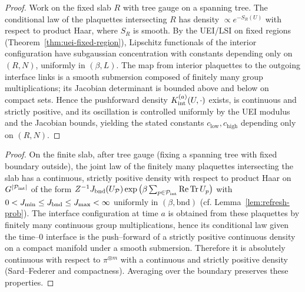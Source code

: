 \documentclass[11pt]{amsart}
\theoremstyle{plain}
\theoremstyle{definition}
\theoremstyle{remark}
\begin{document}
\begin{proof}
Work on the fixed slab $R$ with tree gauge on a spanning tree. The conditional law of the plaquettes intersecting $R$ has density $\propto e^{-S_R(U)}$ with respect to product Haar, where $S_R$ is smooth. By the UEI/LSI on fixed regions (Theorem~\ref{thm:uei-fixed-region}), Lipschitz functionals of the interior configuration have subgaussian concentration with constants depending only on $(R,N)$, uniformly in $(\beta,L)$. The map from interior plaquettes to the outgoing interface links is a smooth submersion composed of finitely many group multiplications; its Jacobian determinant is bounded above and below on compact sets. Hence the pushforward density $K_{\rm int}^{(a)}(U,\cdot)$ exists, is continuous and strictly positive, and its oscillation is controlled uniformly by the UEI modulus and the Jacobian bounds, yielding the stated constants $c_\mathrm{low},c_\mathrm{high}$ depending only on $(R,N)$.
\end{proof}

\begin{proof}
On the finite slab, after tree gauge (fixing a spanning tree with fixed boundary outside), the joint law of the finitely many plaquettes intersecting the slab has a continuous, strictly positive density with respect to product Haar on $G^{|\mathcal P_{\rm int}|}$ of the form $Z^{-1} J_{\rm bnd}(U_{\mathcal P})\exp\big(\beta \sum_{p\in\mathcal P_{\rm int}} \mathrm{Re\,Tr}\,U_p\big)$ with $0<J_{\min}\le J_{\rm bnd}\le J_{\max}<\infty$ uniformly in $(\beta,\text{bnd})$ (cf. Lemma~\ref{lem:refresh-prob}). The interface configuration at time $a$ is obtained from these plaquettes by finitely many continuous group multiplications, hence its conditional law given the time–$0$ interface is the push–forward of a strictly positive continuous density on a compact manifold under a smooth submersion. Therefore it is absolutely continuous with respect to $\pi^{\otimes m}$ with a continuous and strictly positive density (Sard–Federer and compactness). Averaging over the boundary preserves these properties.
\end{proof}
\end{document}

